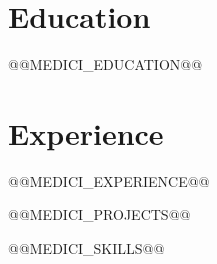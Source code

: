 \documentclass[letterpaper,11pt]{article}
\begin{document}
\section{Education}
@@MEDICI_EDUCATION@@

\section{Experience}
@@MEDICI_EXPERIENCE@@

@@MEDICI_PROJECTS@@

@@MEDICI_SKILLS@@
\end{document}
